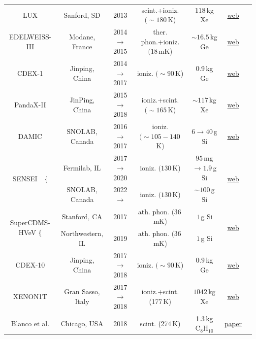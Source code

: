 \begin{table}[t]
\begin{center}
{\begin{tabular}{ccccccc}
 {\sc LUX} & Sanford, SD & 2013 &  scint.+ioniz. $(\sim180\,$K)  & $118\,$kg Xe & \href{http://luxdarkmatter.org}{web} & \cite{LUX}
 \\
 {\sc EDELWEISS-III} & Modane, France & 2014 $\to$ 2015 &  ther. phon.+ioniz. $(18\,$mK) & $\sim16.5\,$kg Ge & \href{http://edelweiss.in2p3.fr}{web} & \cite{EDELWEISS-III}
\\

 {\sc CDEX-1} & Jinping, China & 2014 $\to$ 2017 &  ioniz. $(\sim90\,$K) & 0.9\,kg Ge &  \href{http://cjpl.tsinghua.edu.cn/publish/jinping/903/index.html}{web} & \cite{CDEX-1}
\\
{\sc PandaX-II} & JinPing, China & 2015 $\to$ 2018 &  ioniz.+scint. $(\sim165\,$K) & $\sim117$\,kg Xe &  \href{https://pandax.sjtu.edu.cn}{web} & \cite{PandaX-II} 
\\


{\sc DAMIC} & SNOLAB, Canada & 2016 $\to$ 2017  &  ioniz. $(\sim105-140\,$K)& $6\to40\,$g Si &  \href{http://damic.uchicago.edu}{web} & \cite{DAMIC} \\

\multirow{2}{*}{{\sc SENSEI}~~$\Big\{$} & Fermilab, IL & 2017 $\to$ 2020 &  ioniz. $(130\,$K) & $95\,$mg $\to 1.9$\,g Si &  \multirow{2}{*}{\href{https://sensei-skipper.github.io}{web}} & \multirow{2}{*}{\cite{SENSEI}}
\\
& SNOLAB, Canada & 2022 $\to$  &  ioniz. $(130\,$K) & $\sim 100$\,g Si &   & 
\\

\multirow{2}{*}{{\sc SuperCDMS-HVeV} $\Big\{$} & Stanford, CA & 2017 & ath. phon. $(36\,$mK)  & $1\,$g Si & \multirow{2}{*}{\href{https://supercdms.slac.stanford.edu}{web}} & \multirow{2}{*}{\cite{SuperCDMS-HVeV}} \\
 & Northwestern, IL & 2019 & ath. phon. $(36\,$mK)  & $1\,$g Si & &  \\
 
{\sc CDEX-10} & Jinping, China & 2017 $\to$ 2018 &  ioniz. $(\sim 90\,$K) & $0.9$\,kg Ge&  \href{http://cdex.ep.tsinghua.edu.cn}{web} & \cite{CDEX-10} \\

{\sc XENON1T} & Gran Sasso, Italy & 2017 $\to$ 2018 & ioniz.+scint. (177\,K) & $1042$\,kg Xe & \href{http://www.xenon1t.org}{web} & \cite{Xenon-1T} 
\\

{\sc Blanco et al.} & Chicago, USA  & 2018 &  scint. (274\,K) & 1.3\,kg $\text{C}_8\text{H}_{10}$ & \href{https://doi.org/10.1103/PhysRevD.101.056001}{paper} & \cite{DM:electron:organic:scint}
\\


\end{tabular}}
\end{center}
\end{table}
